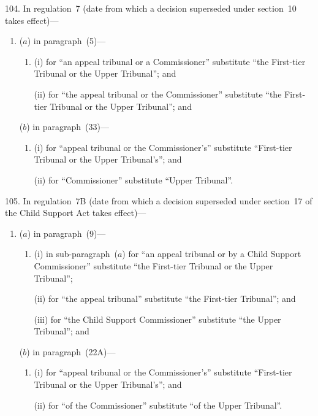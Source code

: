 \documentclass[12pt,a4paper]{article}
\begin{document}
104.  In regulation~7 (date from which a decision superseded under section~10 takes effect)—
\begin{enumerate}\item[]
($a$) in paragraph~(5)—
\begin{enumerate}\item[]
(i) for “an appeal tribunal or a Commissioner” substitute “the First-tier Tribunal or the Upper Tribunal”; and

(ii) for “the appeal tribunal or the Commissioner” substitute “the First-tier Tribunal or the Upper Tribunal”; and
\end{enumerate}

($b$) in paragraph~(33)—
\begin{enumerate}\item[]
(i) for “appeal tribunal or the Commissioner’s” substitute “First-tier Tribunal or the Upper Tribunal’s”; and

(ii) for “Commissioner” substitute “Upper Tribunal”.
\end{enumerate}
\end{enumerate}

\medskip

105.  In regulation~7B (date from which a decision superseded under section~17 of the Child Support Act takes effect)—
\begin{enumerate}\item[]
($a$) in paragraph~(9)—
\begin{enumerate}\item[]
(i) in sub-paragraph~($a$)  for “an appeal tribunal or by a Child Support Commissioner” substitute “the First-tier Tribunal or the Upper Tribunal”;

(ii) for “the appeal tribunal” substitute “the First-tier Tribunal”; and

(iii) for “the Child Support Commissioner” substitute “the Upper Tribunal”; and
\end{enumerate}

($b$) in paragraph~(22A)—
\begin{enumerate}\item[]
(i) for “appeal tribunal or the Commissioner’s” substitute “First-tier Tribunal or the Upper Tribunal’s”; and

(ii) for “of the Commissioner” substitute “of the Upper Tribunal”.
\end{enumerate}
\end{enumerate}

\medskip
\end{document}
